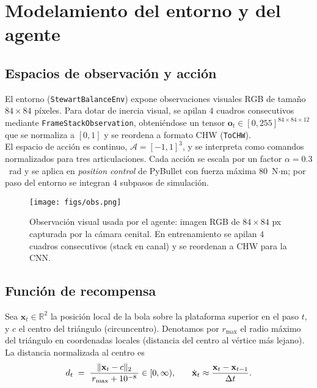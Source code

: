\documentclass[conference]{IEEEtran}
\begin{document}
\section{Modelamiento del entorno y del agente}
\label{sec:modelado}

\subsection{Espacios de observación y acción}
El entorno (\texttt{StewartBalanceEnv}) expone observaciones visuales RGB de tamaño $84{\times}84$ píxeles. Para dotar de inercia visual, se apilan $4$ cuadros consecutivos mediante \texttt{FrameStackObservation}, obteniéndose un tensor $\mathbf{o}_t \in [0,255]^{84\times 84\times 12}$ que se normaliza a $[0,1]$ y se reordena a formato CHW (\texttt{ToCHW}).\\
El espacio de acción es continuo, $\mathcal{A}=[-1,1]^3$, y se interpreta como comandos normalizados para tres articulaciones. Cada acción se escala por un factor $\alpha{=}0.3$~rad y se aplica en \textit{position control} de PyBullet con fuerza máxima $80$~N$\cdot$m; por paso del entorno se integran $4$ subpasos de simulación.

\begin{figure}[th]
  \centering
  \texttt{[image: figs/obs.png]}
  \caption{Observación visual usada por el agente: imagen RGB de $84{\times}84$ px capturada por la cámara cenital. En entrenamiento se apilan $4$ cuadros consecutivos (stack en canal) y se reordenan a CHW para la CNN.}
  \label{fig:obs}
\end{figure}

\subsection{Función de recompensa}
\label{subsec:reward}
Sea $\mathbf{x}_t\!\in\!\mathbb{R}^2$ la posición local de la bola sobre la plataforma superior en el paso $t$, y $c$ el centro del triángulo (circuncentro). Denotamos por $r_{\max}$ el radio máximo del triángulo en coordenadas locales (distancia del centro al vértice más lejano). La distancia normalizada al centro es
\begin{equation}
\small
d_t \;=\; \frac{\lVert \mathbf{x}_t - c \rVert_2}{\,r_{\max}+10^{-8}\,}\in[0,\infty), 
\qquad
\dot{\mathbf{x}}_t \approx \frac{\mathbf{x}_t-\mathbf{x}_{t-1}}{\Delta t}.
\label{eq:dnorm}
\end{equation}
\end{document}
